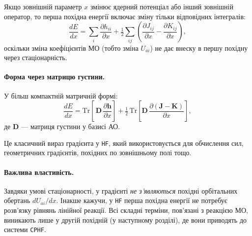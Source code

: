 \documentclass{PySCFBook}
\begin{document}
Якщо зовнішній параметр $x$ змінює ядерний потенціал або інший зовнішній
оператор, то перша похідна енергії включає зміну тільки відповідних
інтегралів:
\begin{equation}\label{eq:HF_gradient_one_electron}
\frac{dE}{dx}
=
\sum_i \frac{\partial h_{ii}}{\partial x}
+
\tfrac12 \sum_{ij}
\left(
\frac{\partial J_{ij}}{\partial x}
-
\frac{\partial K_{ij}}{\partial x}
\right),
\end{equation}
оскільки зміна коефіцієнтів МО (тобто зміна $U_{ai}$) не дає внеску
в першу похідну через стаціонарність.

\paragraph{Форма через матрицю густини.}
У більш компактній матричній формі:
\begin{equation}\label{eq:HF_gradient_density_matrix}
\frac{dE}{dx}
=
\mathrm{Tr}\!\left[\,\mathbf D\,\frac{\partial \mathbf h}{\partial x}\right]
+
\tfrac12\,\mathrm{Tr}\!\left[\mathbf D\,\frac{\partial (\mathbf J - \mathbf K)}{\partial x}\right],
\end{equation}
де $\mathbf D$ --- матриця густини у базисі АО.

Це класичний вираз градієнта у \texttt{HF}, який використовується для
обчислення сил, геометричних градієнтів, похідних по зовнішньому полі тощо.

\paragraph{Важлива властивість.}
Завдяки умові стаціонарності, у градієнті \emph{не з'являються} похідні
орбітальних обертань $dU_{ai}/dx$.
Інакше кажучи, у \texttt{HF} перша похідна енергії не потребує розв’язку
рівнянь лінійної реакції. Всі складні терміни, пов'язані з реакцією МО,
виникають лише у другій похідній (у наступному розділі), де вони приводять
до системи \texttt{CPHF}.


%
%
\end{document}
